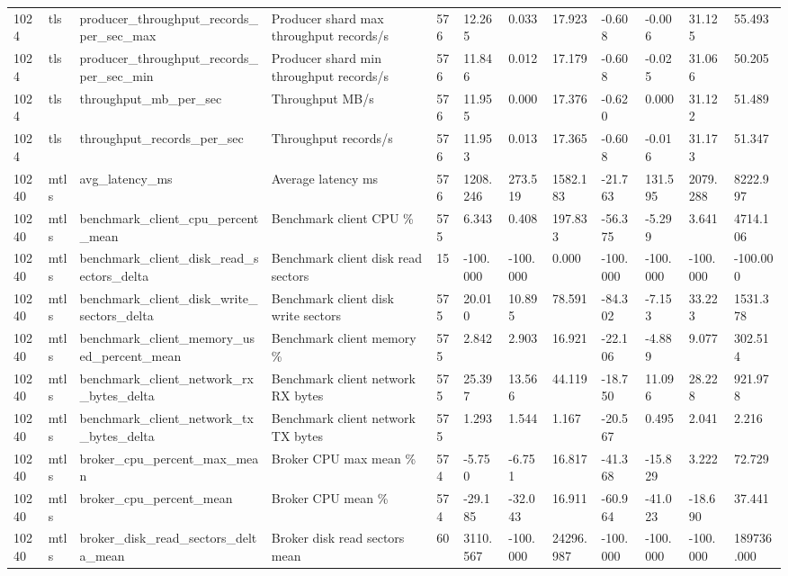 \begin{longtable}{llllllllllll}
1024 & tls & producer\_throughput\_records\_per\_sec\_max & Producer shard max throughput records/s & 576 & 12.265 & 0.033 & 17.923 & -0.608 & -0.006 & 31.125 & 55.493 \\
1024 & tls & producer\_throughput\_records\_per\_sec\_min & Producer shard min throughput records/s & 576 & 11.846 & 0.012 & 17.179 & -0.608 & -0.025 & 31.066 & 50.205 \\
1024 & tls & throughput\_mb\_per\_sec & Throughput MB/s & 576 & 11.955 & 0.000 & 17.376 & -0.620 & 0.000 & 31.122 & 51.489 \\
1024 & tls & throughput\_records\_per\_sec & Throughput records/s & 576 & 11.953 & 0.013 & 17.365 & -0.608 & -0.016 & 31.173 & 51.347 \\
10240 & mtls & avg\_latency\_ms & Average latency ms & 576 & 1208.246 & 273.519 & 1582.183 & -21.763 & 131.595 & 2079.288 & 8222.997 \\
10240 & mtls & benchmark\_client\_cpu\_percent\_mean & Benchmark client CPU \% & 575 & 6.343 & 0.408 & 197.833 & -56.375 & -5.299 & 3.641 & 4714.106 \\
10240 & mtls & benchmark\_client\_disk\_read\_sectors\_delta & Benchmark client disk read sectors & 15 & -100.000 & -100.000 & 0.000 & -100.000 & -100.000 & -100.000 & -100.000 \\
10240 & mtls & benchmark\_client\_disk\_write\_sectors\_delta & Benchmark client disk write sectors & 575 & 20.010 & 10.895 & 78.591 & -84.302 & -7.153 & 33.223 & 1531.378 \\
10240 & mtls & benchmark\_client\_memory\_used\_percent\_mean & Benchmark client memory \% & 575 & 2.842 & 2.903 & 16.921 & -22.106 & -4.889 & 9.077 & 302.514 \\
10240 & mtls & benchmark\_client\_network\_rx\_bytes\_delta & Benchmark client network RX bytes & 575 & 25.397 & 13.566 & 44.119 & -18.750 & 11.096 & 28.228 & 921.978 \\
10240 & mtls & benchmark\_client\_network\_tx\_bytes\_delta & Benchmark client network TX bytes & 575 & 1.293 & 1.544 & 1.167 & -20.567 & 0.495 & 2.041 & 2.216 \\
10240 & mtls & broker\_cpu\_percent\_max\_mean & Broker CPU max mean \% & 574 & -5.750 & -6.751 & 16.817 & -41.368 & -15.829 & 3.222 & 72.729 \\
10240 & mtls & broker\_cpu\_percent\_mean & Broker CPU mean \% & 574 & -29.185 & -32.043 & 16.911 & -60.964 & -41.023 & -18.690 & 37.441 \\
10240 & mtls & broker\_disk\_read\_sectors\_delta\_mean & Broker disk read sectors mean & 60 & 3110.567 & -100.000 & 24296.987 & -100.000 & -100.000 & -100.000 & 189736.000 \\

\end{longtable}
